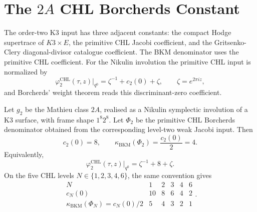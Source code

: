 \providecommand{\cO}{\mathcal{O}}

\section{The \texorpdfstring{$2A$}{2A} CHL Borcherds Constant}
\label{note:sec:direct-phi2A-chl-constant}

The order-two K3 input has three adjacent constants: the compact
Hodge supertrace of \(K3\times E\), the primitive CHL Jacobi
coefficient, and the Gritsenko-Clery diagonal-divisor catalogue
coefficient.  The BKM denominator uses the primitive CHL coefficient.
For the Nikulin involution the primitive CHL input is normalized by
\[
  \varphi^{\mathrm{CHL}}_{2}(\tau,z)\big|_{q^0}
  =
  \zeta^{-1} + c_2(0) + \zeta ,
  \qquad \zeta=e^{2\pi i z},
\]
and Borcherds' weight theorem reads this discriminant-zero coefficient.

\begin{theorem}
\label{note:thm:direct-phi2A-chl-c2}
Let \(g_2\) be the Mathieu class \(2A\), realised as a Nikulin
symplectic involution of a K3 surface, with frame shape \(1^8 2^8\).
Let \(\Phi_2\) be the primitive CHL Borcherds denominator obtained from
the corresponding level-two weak Jacobi input.  Then
\[
  c_2(0)=8,\qquad
  \kappa_{\mathrm{BKM}}(\Phi_2)=\frac{c_2(0)}{2}=4.
\]
Equivalently,
\[
  \varphi^{\mathrm{CHL}}_{2}(\tau,z)\big|_{q^0}
  =
  \zeta^{-1}+8+\zeta .
\]
On the five CHL levels \(N\in\{1,2,3,4,6\}\), the same convention gives
\[
  \begin{array}{c|ccccc}
  N & 1 & 2 & 3 & 4 & 6\\
  \hline
  c_N(0) & 10 & 8 & 6 & 4 & 2\\
  \kappa_{\mathrm{BKM}}(\Phi_N)=c_N(0)/2
    & 5 & 4 & 3 & 2 & 1
  \end{array}.
\]
\end{theorem}


